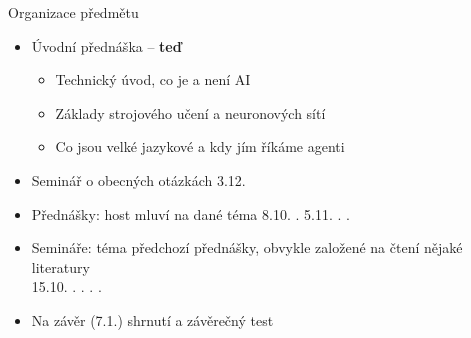 \begin{frame}{Organizace předmětu}

    \begin{itemize}[<+->]

        \item Úvodní přednáška -- \textbf{teď}

        \begin{itemize}[<+->]

            \item Technický úvod, co je a není AI

            \item Základy strojového učení a neuronových sítí

            \item Co jsou velké jazykové a kdy jím říkáme agenti

        \end{itemize}

		\item Seminář o obecných otázkách 3.12.

        \item Přednášky: host mluví na dané téma
            \hfill \phantom{0}8.10. . \quad \phantom{0}5.11. . .

        \item Semináře: téma předchozí přednášky, obvykle založené na čtení
            nějaké literatury \\
            \hfill 15.10. . . . .

        \item Na závěr (7.1.) shrnutí a závěrečný test

    \end{itemize}

    \vspace{5pt}

    \centering

\end{frame}

